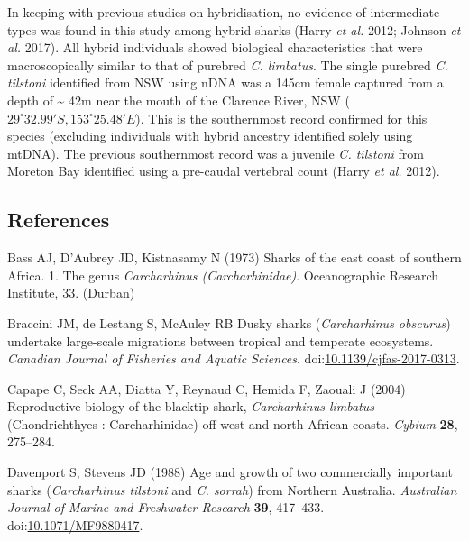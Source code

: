 \documentclass[]{article}
\begin{document}
In keeping with previous studies on hybridisation, no evidence of
intermediate types was found in this study among hybrid sharks (Harry
\emph{et al.} 2012; Johnson \emph{et al.} 2017). All hybrid individuals
showed biological characteristics that were macroscopically similar to
that of purebred \emph{C. limbatus}. The single purebred \emph{C.
tilstoni} identified from NSW using nDNA was a 145cm female captured
from a depth of \textasciitilde{} 42m near the mouth of the Clarence
River, NSW (\(29^\circ 32.99'S, 153^\circ 25.48'E\)). This is the
southernmost record confirmed for this species (excluding individuals
with hybrid ancestry identified solely using mtDNA). The previous
southernmost record was a juvenile \emph{C. tilstoni} from Moreton Bay
identified using a pre-caudal vertebral count (Harry \emph{et al.}
2012).

\hypertarget{references}{%
\subsection*{References}\label{references}}

\hypertarget{refs}{}
\leavevmode\hypertarget{ref-bass_sharks_1973}{}%
Bass AJ, D'Aubrey JD, Kistnasamy N (1973) Sharks of the east coast of
southern Africa. 1. The genus \emph{Carcharhinus (Carcharhinidae)}.
Oceanographic Research Institute, 33. (Durban)

\leavevmode\hypertarget{ref-braccini_dusky_Inpress}{}%
Braccini JM, de Lestang S, McAuley RB Dusky sharks (\emph{Carcharhinus
obscurus}) undertake large-scale migrations between tropical and
temperate ecosystems. \emph{Canadian Journal of Fisheries and Aquatic
Sciences}.
doi:\href{https://doi.org/10.1139/cjfas-2017-0313}{10.1139/cjfas-2017-0313}.

\leavevmode\hypertarget{ref-capape_reproductive_2004}{}%
Capape C, Seck AA, Diatta Y, Reynaud C, Hemida F, Zaouali J (2004)
Reproductive biology of the blacktip shark, \emph{Carcharhinus limbatus}
(Chondrichthyes : Carcharhinidae) off west and north African coasts.
\emph{Cybium} \textbf{28}, 275--284.

\leavevmode\hypertarget{ref-davenport_age_1988}{}%
Davenport S, Stevens JD (1988) Age and growth of two commercially
important sharks (\emph{Carcharhinus tilstoni} and \emph{C. sorrah})
from Northern Australia. \emph{Australian Journal of Marine and
Freshwater Research} \textbf{39}, 417--433.
doi:\href{https://doi.org/10.1071/MF9880417}{10.1071/MF9880417}.
\end{document}
